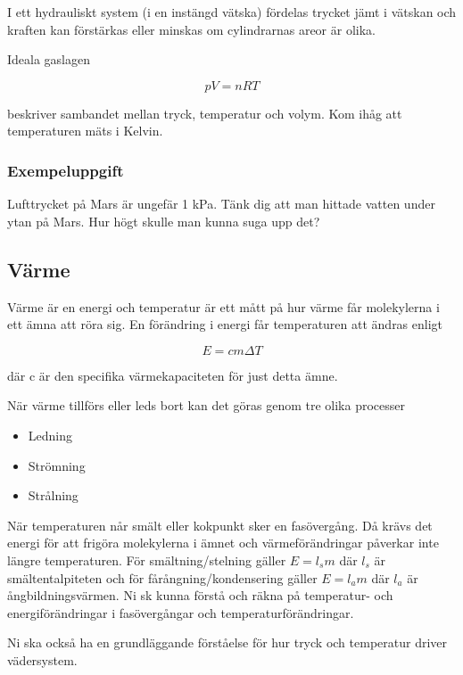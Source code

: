 \documentclass[10pt, titlepage, oneside, a4paper]{article}
\newcommand{\Subsection}[1]{\vspace{-4pt}\subsection{#1}\vspace{-8pt}}
\begin{document}
    I ett hydrauliskt system (i en instängd vätska) fördelas trycket jämt i vätskan och kraften kan förstärkas eller minskas
    om cylindrarnas areor är olika.

    Ideala gaslagen

    \begin{equation}
        pV = nRT
    \end{equation}

    beskriver sambandet mellan tryck, temperatur och volym. Kom ihåg att temperaturen mäts i Kelvin.
    \subsubsection{Exempeluppgift}
    Lufttrycket på Mars är ungefär 1 kPa. Tänk dig att man hittade vatten under ytan på Mars. Hur högt
    skulle man kunna suga upp det?
    \newpage
    \Subsection{Värme}
    Värme är en energi och temperatur är ett mått på hur värme får molekylerna i ett ämna att röra sig. En förändring i energi
    får temperaturen att ändras enligt

    \begin{equation}
        E = c m \Delta T
    \end{equation}

    där c är den specifika värmekapaciteten för just detta ämne.

    När värme tillförs eller leds bort kan det göras genom tre olika processer
    \begin{itemize}
        \item Ledning
        \item Strömning
        \item Strålning
    \end{itemize}
    När temperaturen når smält eller kokpunkt sker en fasövergång. Då krävs det energi för att frigöra molekylerna i ämnet
    och värmeförändringar påverkar inte längre temperaturen. För smältning/stelning gäller $E = l_s m$ där $l_s$ är
    smältentalpiteten och för fårångning/kondensering gäller $E = l_a m$ där $l_a$ är ångbildningsvärmen. Ni sk kunna förstå
    och räkna på temperatur- och energiförändringar i fasövergångar och temperaturförändringar.

    Ni ska också ha en grundläggande förståelse för hur tryck och temperatur driver vädersystem.
\end{document}
